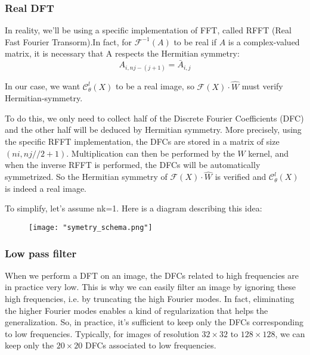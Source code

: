 \subsubsection{Real DFT}

In reality, we'll be using a specific implementation of FFT, called RFFT (Real Fast Fourier Transorm).In fact, for $\mathcal{F}^{-1}(A)$ to be real if $A$ is a complex-valued matrix, it is necessary that A respects the Hermitian symmetry:
\begin{equation*}
	A_{i,nj-(j+1)} = \bar{A}_{i,j}
\end{equation*}

In our case, we want $\mathcal{C}_\theta^l(X)$ to be a real image, so $\mathcal{F}(X)\cdot\hat{W}$ must verify Hermitian-symmetry.

To do this, we only need to collect half of the Discrete Fourier Coefficients (DFC) and the other half will be deduced by Hermitian symmetry. More precisely, using the specific RFFT implementation, the DFCs are stored in a matrix of size $(ni,nj//2+1)$. Multiplication can then be performed by the $\hat{W}$ kernel, and when the inverse RFFT is performed, the DFCs will be automatically symmetrized. So the Hermitian symmetry of $\mathcal{F}(X)\cdot\hat{W}$ is verified and $\mathcal{C}_\theta^l(X)$ is indeed a real image.

To simplify, let's assume nk=1. Here is a diagram describing this idea:

\begin{figure}[H]
	\centering
	\texttt{[image: "symetry\_schema.png"]}
\end{figure}

\subsubsection{Low pass filter}

When we perform a DFT on an image, the DFCs related to high frequencies are in practice very low. This is why we can easily filter an image by ignoring these high frequencies, i.e. by truncating the high Fourier modes. In fact, eliminating the higher Fourier modes enables a kind of regularization that helps the generalization. So, in practice, it's sufficient to keep only the DFCs corresponding to low frequencies. Typically, for images of resolution $32\times 32$ to $128\times 128$, we can keep only the $20\times 20$ DFCs associated to low frequencies.

